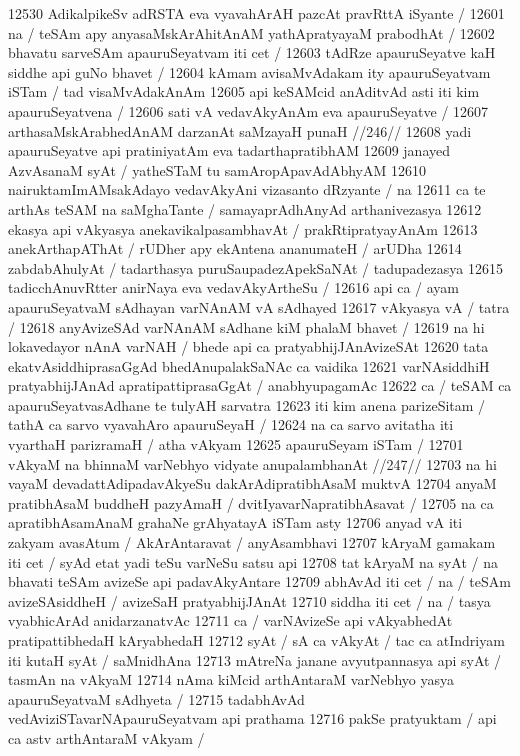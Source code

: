 12530 AdikalpikeSv adRSTA eva vyavahArAH pazcAt pravRttA iSyante / 
12601 na / teSAm apy anyasaMskArAhitAnAM yathApratyayaM prabodhAt /  
12602 bhavatu sarveSAm apauruSeyatvam iti cet /  
12603 	tAdRze apauruSeyatve kaH siddhe api guNo bhavet / 
12604 kAmam avisaMvAdakam ity apauruSeyatvam iSTam / tad visaMvAdakAnAm 
12605 api keSAMcid anAditvAd asti iti kim apauruSeyatvena /
12606 sati vA vedavAkyAnAm eva apauruSeyatve /  
12607 	arthasaMskArabhedAnAM darzanAt saMzayaH punaH //246// 
12608 yadi apauruSeyatve api pratiniyatAm eva tadarthapratibhAM 
12609 janayed AzvAsanaM syAt / yatheSTaM tu samAropApavAdAbhyAM  
12610 nairuktamImAMsakAdayo vedavAkyAni vizasanto dRzyante / na  
12611 ca te arthAs teSAM na saMghaTante / samayaprAdhAnyAd arthanivezasya
12612 ekasya api vAkyasya anekavikalpasambhavAt / prakRtipratyayAnAm  
12613 anekArthapAThAt / rUDher apy ekAntena ananumateH / arUDha  
12614 zabdabAhulyAt / tadarthasya puruSaupadezApekSaNAt / tadupadezasya
12615 tadicchAnuvRtter anirNaya eva vedavAkyArtheSu / 
12616 api ca / ayam apauruSeyatvaM sAdhayan varNAnAM vA sAdhayed  
12617 vAkyasya vA / tatra /
12618 	anyAvizeSAd varNAnAM sAdhane kiM phalaM bhavet /
12619 na hi lokavedayor nAnA varNAH / bhede api ca pratyabhijJAnAvizeSAt
12620 tata ekatvAsiddhiprasaGgAd bhedAnupalakSaNAc ca vaidika  
12621 varNAsiddhiH pratyabhijJAnAd apratipattiprasaGgAt / anabhyupagamAc 
12622 ca / teSAM ca apauruSeyatvasAdhane te tulyAH sarvatra  
12623 iti kim anena parizeSitam / tathA ca sarvo vyavahAro apauruSeyaH /
12624 na ca sarvo avitatha iti vyarthaH parizramaH / atha vAkyam
12625 apauruSeyam iSTam / 
12701 	vAkyaM na bhinnaM varNebhyo vidyate anupalambhanAt //247//
12703 na hi vayaM devadattAdipadavAkyeSu dakArAdipratibhAsaM muktvA
12704 anyaM pratibhAsaM buddheH pazyAmaH / dvitIyavarNapratibhAsavat /
12705 na ca apratibhAsamAnaM grahaNe grAhyatayA iSTam asty
12706 anyad vA iti zakyam avasAtum / AkArAntaravat / anyAsambhavi
12707 kAryaM gamakam iti cet / syAd etat yadi teSu varNeSu satsu api 
12708 tat kAryaM na syAt / na bhavati teSAm avizeSe api padavAkyAntare
12709 abhAvAd iti cet / na / teSAm avizeSAsiddheH / avizeSaH pratyabhijJAnAt
12710 siddha iti cet / na / tasya vyabhicArAd anidarzanatvAc  
12711 ca / varNAvizeSe api vAkyabhedAt pratipattibhedaH kAryabhedaH  
12712 syAt / sA ca vAkyAt / tac ca atIndriyam iti kutaH syAt / saMnidhAna
12713 mAtreNa janane avyutpannasya api syAt / tasmAn na vAkyaM  
12714 nAma kiMcid arthAntaraM varNebhyo yasya apauruSeyatvaM sAdhyeta /  
12715 tadabhAvAd vedAviziSTavarNApauruSeyatvam api prathama
12716 pakSe pratyuktam / api ca astv arthAntaraM vAkyam /  
